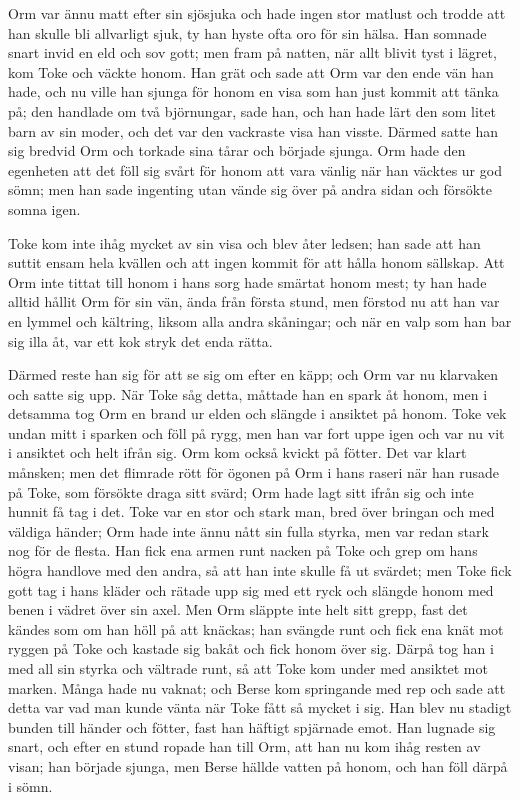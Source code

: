 \initial Orm var ännu matt efter sin sjösjuka och hade ingen stor matlust och trodde att han skulle bli allvarligt sjuk, ty han hyste ofta oro för sin hälsa. Han somnade snart invid en eld och sov gott; men fram på natten, när allt blivit tyst i lägret, kom Toke och väckte honom. Han grät och sade att Orm var den ende vän han hade, och nu ville han sjunga för honom en visa som han just kommit att tänka på; den handlade om två björnungar, sade han, och han hade lärt den som litet barn av sin moder, och det var den vackraste visa han visste. Därmed satte han sig bredvid Orm och torkade sina tårar och började sjunga. Orm hade den egenheten att det föll sig svårt för honom att vara vänlig när han väcktes ur god sömn; men han sade ingenting utan vände sig över på andra sidan och försökte somna igen.

\initial Toke kom inte ihåg mycket av sin visa och blev åter ledsen; han sade att han suttit ensam hela kvällen och att ingen kommit för att hålla honom sällskap. Att Orm inte tittat till honom i hans sorg hade smärtat honom mest; ty han hade alltid hållit Orm för sin vän, ända från första stund, men förstod nu att han var en lymmel och kältring, liksom alla andra skåningar; och när en valp som han bar sig illa åt, var ett kok stryk det enda rätta.

\initial Därmed reste han sig för att se sig om efter en käpp; och Orm var nu klarvaken och satte sig upp. När Toke såg detta, måttade han en spark åt honom, men i detsamma tog Orm en brand ur elden och slängde i ansiktet på honom. Toke vek undan mitt i sparken och föll på rygg, men han var fort uppe igen och var nu vit i ansiktet och helt ifrån sig. Orm kom också kvickt på fötter. Det var klart månsken; men det flimrade rött för ögonen på Orm i hans raseri när han rusade på Toke, som försökte draga sitt svärd; Orm hade lagt sitt ifrån sig och inte hunnit få tag i det. Toke var en stor och stark man, bred över bringan och med väldiga händer; Orm hade inte ännu nått sin fulla styrka, men var redan stark nog för de flesta. Han fick ena armen runt nacken på Toke och grep om hans högra handlove med den andra, så att han inte skulle få ut svärdet; men Toke fick gott tag i hans kläder och rätade upp sig med ett ryck och slängde honom med benen i vädret över sin axel. Men Orm släppte inte helt sitt grepp, fast det kändes som om han höll på att knäckas; han svängde runt och fick ena knät mot ryggen på Toke och kastade sig bakåt och fick honom över sig. Därpå tog han i med all sin styrka och vältrade runt, så att Toke kom under med ansiktet mot marken. Många hade nu vaknat; och Berse kom springande med rep och sade att detta var vad man kunde vänta när Toke fått så mycket i sig. Han blev nu stadigt bunden till händer och fötter, fast han häftigt spjärnade emot. Han lugnade sig snart, och efter en stund ropade han till Orm, att han nu kom ihåg resten av visan; han började sjunga, men Berse hällde vatten på honom, och han föll därpå i sömn.

